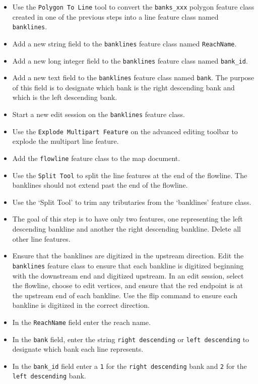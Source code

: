 \documentclass[]{book}
\providecommand{\tightlist}{%
  \setlength{\itemsep}{0pt}\setlength{\parskip}{0pt}}
\theoremstyle{definition}
\theoremstyle{definition}
\theoremstyle{definition}
\theoremstyle{remark}
\begin{document}
\begin{itemize}
\tightlist
\item
  Use the \texttt{Polygon\ To\ Line} tool to convert the
  \texttt{banks\_xxx} polygon feature class created in one of the
  previous steps into a line feature class named \texttt{banklines}.
\item
  Add a new string field to the \texttt{banklines} feature class named
  \texttt{ReachName}.\\
\item
  Add a new long integer field to the \texttt{banklines} feature class
  named \texttt{bank\_id}.
\item
  Add a new text field to the \texttt{banklines} feature class named
  \texttt{bank}. The purpose of this field is to designate which bank is
  the right descending bank and which is the left descending bank.
\item
  Start a new edit session on the \texttt{banklines} feature class.
\item
  Use the \texttt{Explode\ Multipart\ Feature} on the advanced editing
  toolbar to explode the multipart line feature.
\item
  Add the \texttt{flowline} feature class to the map document.
\item
  Use the \texttt{Split\ Tool} to split the line features at the end of
  the flowline. The banklines should not extend past the end of the
  flowline.
\item
  Use the `Split Tool' to trim any tributaries from the `banklines'
  feature class.
\item
  The goal of this step is to have only two features, one representing
  the left descending bankline and another the right descending
  bankline. Delete all other line features.
\item
  Ensure that the banklines are digitized in the upstream direction.
  Edit the \texttt{banklines} feature class to ensure that each bankline
  is digitized beginning with the downstream end and digitized upstream.
  In an edit session, select the flowline, choose to edit vertices, and
  ensure that the red endpoint is at the upstream end of each bankline.
  Use the flip command to ensure each bankline is digitized in the
  correct direction.
\item
  In the \texttt{ReachName} field enter the reach name.
\item
  In the \texttt{bank} field, enter the string
  \texttt{right\ descending} or \texttt{left\ descending} to designate
  which bank each line represents.
\item
  In the \texttt{bank\_id} field enter a \texttt{1} for the
  \texttt{right\ descending} bank and \texttt{2} for the
  \texttt{left\ descending} bank.
\end{itemize}
\end{document}
